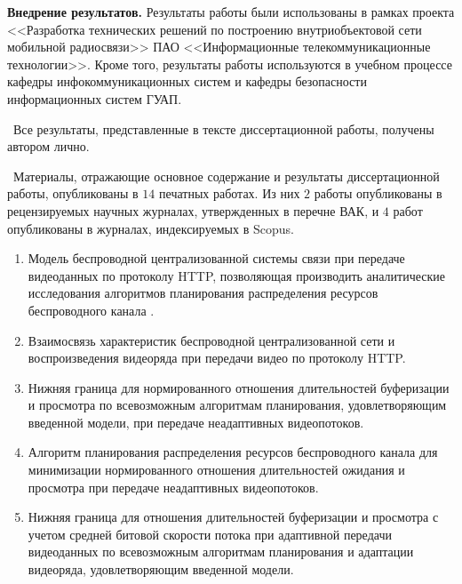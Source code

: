 \textbf{Внедрение результатов.} Результаты работы были использованы в рамках проекта <<Разработка технических решений по построению внутриобъектовой сети мобильной радиосвязи>> ПАО <<Информационные телекоммуникационные технологии>>. Кроме того, результаты работы используются в учебном процессе кафедры инфокоммуникационных систем и кафедры безопасности информационных систем ГУАП.

\contribution\ Все результаты, представленные в тексте диссертационной работы, получены автором лично.

\publications\ Материалы, отражающие основное содержание и результаты диссертационной работы, опубликованы в $14$ печатных работах. Из них $2$ работы опубликованы в рецензируемых научных журналах, утвержденных в перечне ВАК, и $4$ работ опубликованы в журналах, индексируемых в Scopus.

\begin{enumerate}
    \item Модель беспроводной централизованной системы связи при передаче видеоданных по протоколу HTTP, позволяющая производить аналитические исследования алгоритмов планирования распределения ресурсов беспроводного канала .
    \item Взаимосвязь характеристик беспроводной централизованной сети и воспроизведения видеоряда при передачи видео по протоколу HTTP.
    \item Нижняя граница для нормированного отношения длительностей буферизации и просмотра по всевозможным алгоритмам планирования, удовлетворяющим введенной модели, при передаче неадаптивных видеопотоков.
    \item Алгоритм планирования распределения ресурсов беспроводного канала для минимизации нормированного отношения длительностей ожидания и просмотра при передаче неадаптивных видеопотоков.
    \item Нижняя граница для отношения длительностей буферизации и просмотра с учетом средней битовой скорости потока при адаптивной передачи видеоданных по всевозможным алгоритмам планирования и адаптации видеоряда, удовлетворяющим введенной модели.
\end{enumerate}

